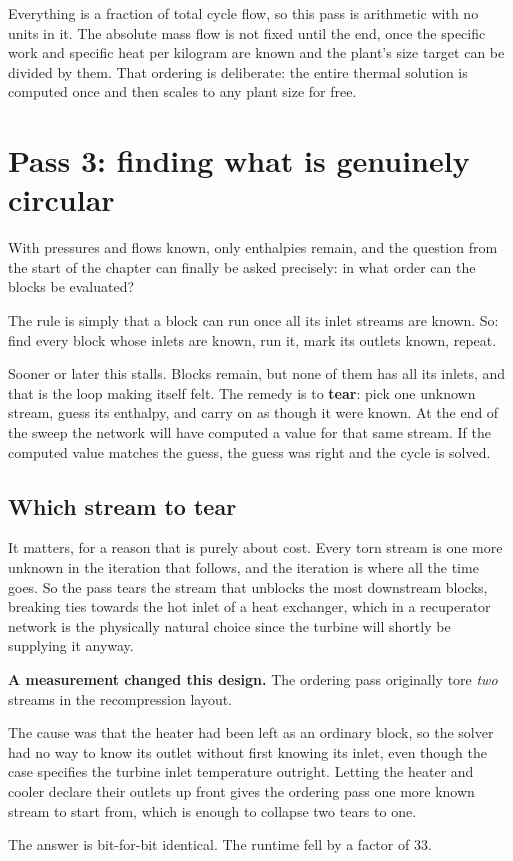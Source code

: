 \documentclass[11pt,a4paper]{report}
\begin{document}
Everything is a fraction of total cycle flow, so this pass is arithmetic
with no units in it. The absolute mass flow is not fixed until the end, once
the specific work and specific heat per kilogram are known and the plant's
size target can be divided by them. That ordering is deliberate: the entire
thermal solution is computed once and then scales to any plant size for
free.

\section{Pass 3: finding what is genuinely circular}

With pressures and flows known, only enthalpies remain, and the question
from the start of the chapter can finally be asked precisely: in what order
can the blocks be evaluated?

The rule is simply that a block can run once all its inlet streams are
known. So: find every block whose inlets are known, run it, mark its outlets
known, repeat.

Sooner or later this stalls. Blocks remain, but none of them has all its
inlets, and that is the loop making itself felt. The remedy is to
\textbf{tear}: pick one unknown stream, guess its enthalpy, and carry on as
though it were known. At the end of the sweep the network will have computed
a value for that same stream. If the computed value matches the guess, the
guess was right and the cycle is solved.

\subsection{Which stream to tear}

It matters, for a reason that is purely about cost. Every torn stream is one
more unknown in the iteration that follows, and the iteration is where all
the time goes. So the pass tears the stream that unblocks the most
downstream blocks, breaking ties towards the hot inlet of a heat exchanger,
which in a recuperator network is the physically natural choice since the
turbine will shortly be supplying it anyway.


\begin{choicebox}
\textbf{A measurement changed this design.} The ordering pass originally
tore \emph{two} streams in the recompression layout.

The cause was that the heater had been left as an ordinary block, so the
solver had no way to know its outlet without first knowing its inlet, even
though the case specifies the turbine inlet temperature outright. Letting
the heater and cooler declare their outlets up front gives the ordering pass
one more known stream to start from, which is enough to collapse two tears
to one.

The answer is bit-for-bit identical. The runtime fell by a factor of
\num{33}.
\end{choicebox}
\end{document}
